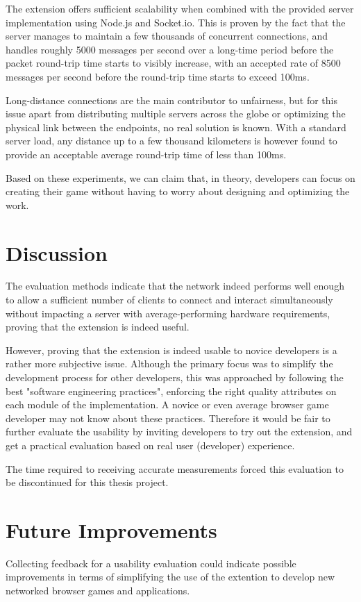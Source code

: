 \documentclass[bsc, 12pt, twoside, singlespacing, parskip, abbrevs, notimes, normalheadings, logo, deptreport]{styles/infthesis}
\begin{document}
The extension offers sufficient scalability when combined with the provided server implementation using Node.js and Socket.io. This is proven by the fact that the server manages to maintain a few thousands of concurrent connections, and handles roughly 5000 messages per second over a long-time period before the packet round-trip time starts to visibly increase, with an accepted rate of 8500 messages per second before the round-trip time starts to exceed 100ms. 

Long-distance connections are the main contributor to unfairness, but for this issue apart from distributing multiple servers across the globe or optimizing the physical link between the endpoints, no real solution is known. With a standard server load, any distance up to a few thousand kilometers is however found to provide an acceptable average round-trip time of less than 100ms.

Based on these experiments, we can claim that, in theory, developers can focus on creating their game without having to worry about designing and optimizing the work.

\section{Discussion}
The evaluation methods indicate that the network indeed performs well enough to allow a sufficient number of clients to connect and interact simultaneously without impacting a server with average-performing hardware requirements, proving that the extension is indeed useful.

However, proving that the extension is indeed usable to novice developers is a rather more subjective issue. Although the primary focus was to simplify the development process for other developers, this was approached by following the best "software engineering practices", enforcing the right quality attributes on each module of the implementation. A novice or even average browser game developer may not know about these practices. Therefore it would be fair to further evaluate the usability by inviting developers to try out the extension, and get a practical evaluation based on real user (developer) experience.

The time required to receiving accurate measurements forced this evaluation to be discontinued for this thesis project.

\section{Future Improvements}
Collecting feedback for a usability evaluation could indicate possible improvements in terms of simplifying the use of the extention to develop new networked browser games and applications.
\end{document}

